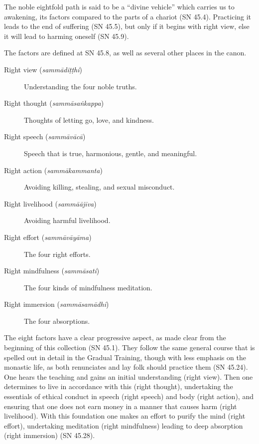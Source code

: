 \documentclass[12pt,openany]{book}%
\begin{document}
The noble eightfold path is said to be a “divine vehicle” which carries us to awakening, its factors compared to the parts of a chariot (SN 45.4). Practicing it leads to the end of suffering (SN 45.5), but only if it begins with right view, else it will lead to harming oneself (SN 45.9).

The factors are defined at SN 45.8, as well as several other places in the canon.

\begin{description}%
\item[Right view (\textit{\textsanskrit{sammādiṭṭhi}})] Understanding the four noble truths.%
\item[Right thought (\textit{\textsanskrit{sammāsaṅkappa}})] Thoughts of letting go, love, and kindness.%
\item[Right speech (\textit{\textsanskrit{sammāvācā}})] Speech that is true, harmonious, gentle, and meaningful.%
\item[Right action (\textit{\textsanskrit{sammākammanta}})] Avoiding killing, stealing, and sexual misconduct.%
\item[Right livelihood (\textit{\textsanskrit{sammāājīva}})] Avoiding harmful livelihood.%
\item[Right effort (\textit{\textsanskrit{sammāvāyāma}})] The four right efforts.%
\item[Right mindfulness (\textit{\textsanskrit{sammāsati}})] The four kinds of mindfulness meditation.%
\item[Right immersion (\textit{\textsanskrit{sammāsamādhi}})] The four absorptions.%
\end{description}

The eight factors have a clear progressive aspect, as made clear from the beginning of this collection (SN 45.1). They follow the same general course that is spelled out in detail in the Gradual Training, though with less emphasis on the monastic life, as both renunciates and lay folk should practice them (SN 45.24). One hears the teaching and gains an initial understanding (right view). Then one determines to live in accordance with this (right thought), undertaking the essentials of ethical conduct in speech (right speech) and body (right action), and ensuring that one does not earn money in a manner that causes harm (right livelihood). With this foundation one makes an effort to purify the mind (right effort), undertaking meditation (right mindfulness) leading to deep absorption (right immersion) (SN 45.28).
\end{document}
